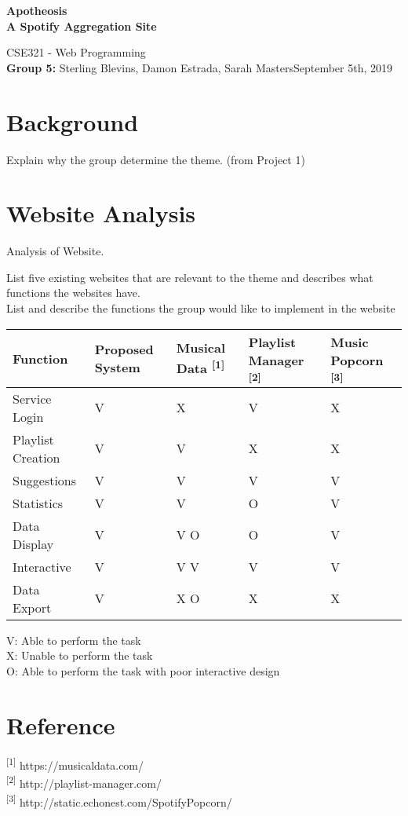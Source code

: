 \documentclass[letter, 11pt]{article}
\begin{document}
\noindent
\begin{center}
\large\textbf{Apotheosis} \\
\textbf{A Spotify Aggregation Site}
\end{center}


\normalsize CSE321 - Web Programming\\
\textbf{Group 5:} Sterling Blevins, Damon Estrada, Sarah Masters\hfill September 5th, 2019
 
\section*{Background}
Explain why the group determine the theme. (from Project 1)

\section*{Website Analysis}
Analysis of Website.

\noindent
List five existing websites that are relevant to the theme and describes what functions the websites have. \\

\noindent
List and describe the functions the group would like to implement in the website \\

\begin{tabular}{ |p{3cm}|p{2cm}|p{2cm}|p{2cm}|p{2cm}|  }
 \hline
 Function & Proposed System & Musical Data \textsuperscript{[1]} & Playlist Manager \textsuperscript{[2]} & Music Popcorn \textsuperscript{[3]}\\
 \hline
 Service Login & V & X & V & X\\
 Playlist Creation & V & V & X & X\\
 Suggestions & V & V & V & V\\
 Statistics & V & V & O & V\\
 Data Display & V & V O & O & V\\
 Interactive & V & V V & V & V\\
 Data Export & V & X O & X & X\\
 \hline
\end{tabular}

V: Able to perform the task \\
\indent
X: Unable to perform the task \\
\indent
O: Able to perform the task with poor interactive design


\section*{Reference}
\noindent
{\textsuperscript{[1]} https://musicaldata.com/} \\
{\textsuperscript{[2]} http://playlist-manager.com/} \\
{\textsuperscript{[3]} http://static.echonest.com/SpotifyPopcorn/}
\end{document}
